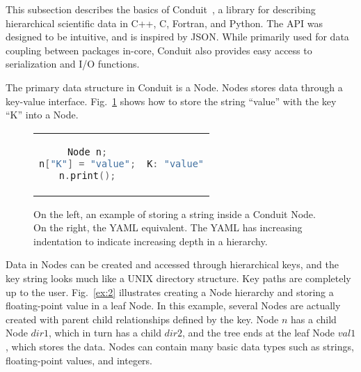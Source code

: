 This subsection describes the basics of Conduit~\cite{conduit_blueprint}, a library for describing
hierarchical scientific data in C++, C, Fortran, and Python.
%
The API was designed to be intuitive, and is inspired by JSON.
%
While primarily used for data coupling between packages in-core,
Conduit also provides easy access to serialization and I/O functions.
%
%

The primary data structure in Conduit is a Node.
%
Nodes stores data through a key-value interface.
%
Fig.~\ref{ex:1} shows how to store the string ``value'' with the key ``K'' into a Node.

\begin{figure}
\begin{tabular}{cc}
  \begin{minipage}{.5\textwidth}
  \centering
    \begin{lstlisting}[language=C++]
Node n;
n["K"] = "value";
n.print();
    \end{lstlisting}
  \end{minipage}
  &
  \begin{minipage}{.5\textwidth}
  \centering
  \begin{lstlisting}[language=C++]
K: "value"
  \end{lstlisting}
  \end{minipage}
\end{tabular}
\caption{\label{ex:1}On the left, an example of storing a string inside a Conduit Node. On the right, the YAML equivalent.  The YAML has increasing indentation to indicate increasing depth in a hierarchy.}
\end{figure}

Data in Nodes can be created and accessed through hierarchical keys,
and the key string looks much like a UNIX directory structure.
%
Key paths are completely up to the user.
%
Fig.~\ref{ex:2} illustrates creating a Node hierarchy
and storing a floating-point value in a leaf Node.
%
In this example, several Nodes are actually created with parent child
relationships defined by the key.
%
Node $n$ has a child Node $dir1$, which in turn has a child $dir2$,
and the tree ends at the leaf Node $val1$, which stores the data.
%
Nodes can contain many basic data types such as strings,
floating-point values, and integers.

